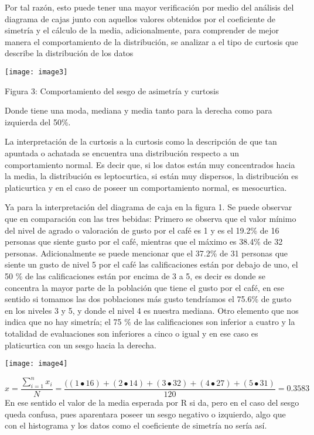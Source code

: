 \documentclass{article} %
\begin{document}
\noindent Por tal raz\'{o}n, esto puede tener una mayor verificaci\'{o}n por medio del an\'{a}lisis del diagrama de cajas junto con aquellos valores obtenidos por el coeficiente de simetr\'{i}a y el c\'{a}lculo de la media, adicionalmente, para comprender de mejor manera el comportamiento de la distribuci\'{o}n, se analizar a el tipo de curtosis que describe la distribuci\'{o}n de los datos

\noindent 

\noindent \texttt{[image: image3]}

\noindent Figura 3: Comportamiento del sesgo de asimetr\'{i}a y curtosis 

\noindent 

\noindent Donde tiene una moda, mediana y media tanto para la derecha como para izquierda del 50\%.

\noindent La interpretaci\'{o}n de la curtosis a la curtosis como la descripci\'{o}n de que tan apuntada o achatada se encuentra una distribuci\'{o}n respecto a un comportamiento normal. Es decir que, si los datos est\'{a}n muy concentrados hacia la media, la distribuci\'{o}n es leptocurtica, si est\'{a}n muy dispersos, la distribuci\'{o}n es platicurtica y en el caso de poseer un comportamiento normal, es mesocurtica.

\noindent Ya para la interpretaci\'{o}n del diagrama de caja en la figura 1.  Se puede observar que en comparaci\'{o}n con las tres bebidas:  Primero se observa que el valor m\'{i}nimo del nivel de agrado o valoraci\'{o}n de gusto por el caf\'{e} es 1 y es el 19.2\% de 16 personas que siente gusto por el caf\'{e}, mientras que el m\'{a}ximo es 38.4\% de 32 personas. Adicionalmente se puede mencionar que el 37.2\% de 31 personas que siente un gusto de nivel 5 por el caf\'{e} las calificaciones est\'{a}n por debajo de uno, el 50 \% de las calificaciones est\'{a}n por encima de 3 a 5, es decir es donde se concentra la mayor parte de la poblaci\'{o}n que tiene el gusto por el caf\'{e}, en ese sentido si tomamos las dos poblaciones m\'{a}s gusto tendr\'{i}amos el 75.6\% de gusto en los niveles 3 y 5, y donde el nivel 4 es nuestra mediana. Otro elemento que nos indica que no hay simetr\'{i}a; el 75 \% de las calificaciones son inferior a cuatro y la totalidad de evaluaciones son inferiores a cinco o igual y en ese caso es platicurtica con un sesgo hacia la derecha.

\noindent \texttt{[image: image4]}

\noindent 
\[\hat{x}=\frac{\sum^n_{i=1}{x_i}}{N}=\frac{(\left(1\bullet 16\right)+\left(2\bullet 14\right)+\left(3\bullet 32\right)+\left(4\bullet 27\right)+(5\bullet 31)}{120}=0.3583\] 
En ese sentido el valor de la media esperada por R si da, pero en el caso del sesgo queda confusa, pues aparentara poseer un sesgo negativo o izquierdo, algo que con el histograma y los datos como el coeficiente de simetr\'{i}a no ser\'{i}a as\'{i}.
\end{document}
